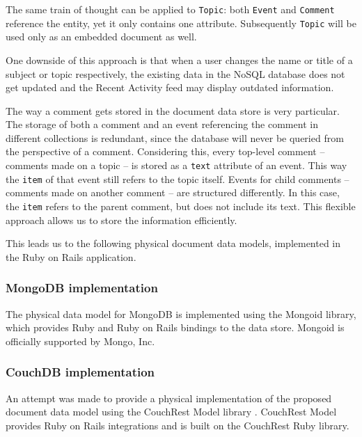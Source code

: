 The same train of thought can be applied to \texttt{Topic}: both \texttt{Event} and \texttt{Comment} reference the entity, yet it only contains one attribute.
Subsequently \texttt{Topic} will be used only as an embedded document as well.

One  downside of this approach is that when a user changes the name or title of a subject or topic respectively, the existing data in the NoSQL database does not get updated and the Recent Activity feed may display outdated information.

The way a comment gets stored in the document data store is very particular.
The storage of both a comment and an event referencing the comment in different collections is redundant, since the database will never be queried from the perspective of a comment.
Considering this, every top-level comment -- comments made on a topic -- is stored as a \texttt{text} attribute of an event.
This way the \texttt{item} of that event still refers to the topic itself.
Events for child comments -- comments made on another comment -- are structured differently.
In this case, the \texttt{item} refers to the parent comment, but does not include its text.
This flexible approach allows us to store the information efficiently.

This leads us to the following physical document data models, implemented in the Ruby on Rails application.

\subsubsection{MongoDB implementation}
\label{subsubsec:mongodb-implementation}

The physical data model for MongoDB is implemented using the Mongoid library, which provides Ruby and Ruby on Rails bindings to the data store.
Mongoid is officially supported by Mongo, Inc.

\subsubsection{CouchDB implementation}
\label{subsubsec:couchdb-implementation}

An attempt was made to provide a physical implementation of the proposed document data model using the CouchRest Model library \autocite{Couchrest2011}.
CouchRest Model provides Ruby on Rails integrations and is built on the CouchRest Ruby library.

